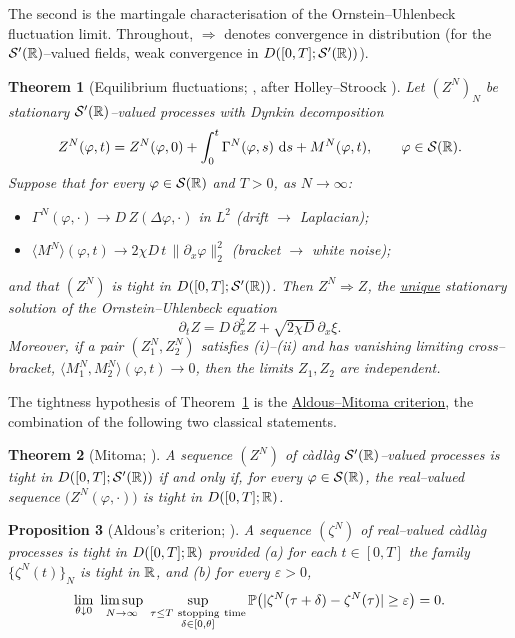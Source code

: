 \documentclass[11pt]{article}
\theoremstyle{plain}
\newtheorem{theorem}{Theorem}[section]
\newtheorem{proposition}[theorem]{Proposition}
\theoremstyle{definition}
\theoremstyle{remark}
\newcommand{\To}{\Rightarrow}\newcommand{\so}{\mathfrak{so}}
\begin{document}
\noindent The second is the martingale characterisation of the Ornstein--Uhlenbeck
fluctuation limit. Throughout, $\To$ denotes convergence in distribution (for the
$\mathcal S'(\mathbb{R})$--valued fields, weak convergence in $D([0,T];\mathcal S'(\mathbb{R}))$).

\begin{theorem}[Equilibrium fluctuations; {\cite[Ch.~11]{KL}}, after Holley--Stroock \cite{HolleyStroock}]\label{thm:mp}
Let $(Z^N)_N$ be stationary $\mathcal S'(\mathbb{R})$--valued processes with Dynkin decomposition
\[
  Z^N(\varphi,t)=Z^N(\varphi,0)+\int_0^t\Gamma^N(\varphi,s)\,\,\mathrm{d} s+M^N(\varphi,t),
  \qquad \varphi\in\mathcal S(\mathbb{R}).
\]
Suppose that for every $\varphi\in\mathcal S(\mathbb{R})$ and $T>0$, as $N\to\infty$:
\begin{itemize}
\item[\textup{(i)}] $\Gamma^N(\varphi,\cdot)\to D\,Z(\Delta\varphi,\cdot)$ in $L^2$
  \quad(drift $\to$ Laplacian);
\item[\textup{(ii)}] $\langle M^N\rangle(\varphi,t)\to 2\chi D\,t\,\|\partial_x\varphi\|_2^2$
  \quad(bracket $\to$ white noise);
\end{itemize}
and that $(Z^N)$ is tight in $D([0,T];\mathcal S'(\mathbb{R}))$. Then $Z^N\To Z$, the \underline{unique}
stationary solution of the Ornstein--Uhlenbeck equation
\[
  \partial_t Z=D\,\partial_x^2 Z+\sqrt{2\chi D}\,\partial_x\xi .
\]
Moreover, if a pair $(Z_1^N,Z_2^N)$ satisfies \textup{(i)--(ii)} and has vanishing
limiting cross--bracket, $\langle M_1^N,M_2^N\rangle(\varphi,t)\to0$, then the limits
$Z_1,Z_2$ are independent.
\end{theorem}

\noindent The tightness hypothesis of Theorem~\ref{thm:mp} is the \underline{Aldous--Mitoma
criterion}, the combination of the following two classical statements.

\begin{theorem}[Mitoma; \cite{Mitoma}]\label{thm:mitoma}
A sequence $(Z^N)$ of c\`adl\`ag $\mathcal S'(\mathbb{R})$--valued processes is tight in
$D([0,T];\mathcal S'(\mathbb{R}))$ if and only if, for every $\varphi\in\mathcal S(\mathbb{R})$, the real--valued
sequence $\big(Z^N(\varphi,\cdot)\big)$ is tight in $D([0,T];\mathbb{R})$.
\end{theorem}

\begin{proposition}[Aldous's criterion; \cite{Aldous}]\label{prop:aldous}
A sequence $(\zeta^N)$ of real--valued c\`adl\`ag processes is tight in $D([0,T];\mathbb{R})$
provided \textup{(a)} for each $t\in[0,T]$ the family $\{\zeta^N(t)\}_N$ is tight in
$\mathbb{R}$, and \textup{(b)} for every $\varepsilon>0$,
\[
  \lim_{\theta\downarrow0}\ \limsup_{N\to\infty}\
  \sup_{\substack{\tau\le T\ \mathrm{stopping\ time}\\ \delta\in[0,\theta]}}
  \PP\big(|\zeta^N(\tau+\delta)-\zeta^N(\tau)|\ge\varepsilon\big)=0 .
\]
\end{proposition}
\end{document}
